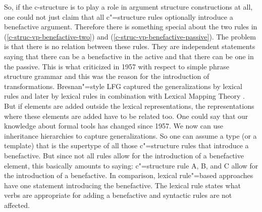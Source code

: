 So, if the c-structure is to play a role in argument structure constructions at all, one could not
just claim that all c"=structure rules optionally introduce a benefactive argument. Therefore there is something special about the two rules in (\ref{c-struc-vp-benefactive-two})
and (\ref{c-struc-vp-benefactive-passive}). The problem is that there is no relation between these
rules. They are independent statements saying that there can be a benefactive in the active and that
there can be one in the passive. This is what \citet[]{Chomsky57a} criticized in 1957 with
respect to simple phrase structure grammar and
this was the reason for the introduction of transformations. Bresnan"=style LFG captured the
generalizations by lexical rules \citep{Bresnan78a,Bresnan82a} and later by lexical rules in combination with Lexical Mapping
Theory \citep{Toivonen2013a}. But if elements are added
outside the lexical representations, the representations where these elements are added 
have to be related too. One could say that our knowledge about formal tools has changed since
1957. We now can use inheritance hierarchies to capture generalizations. So one can assume a type
(or a template) that is the supertype of all those c"=structure rules that introduce a
benefactive. But since not all rules allow for the introduction of a benefactive element, this
basically amounts to saying: c"=structure rule A, B, and C allow for the introduction of a
benefactive. In comparison, lexical rule"=based approaches have one statement introducing the
benefactive. The lexical rule states what verbs are appropriate for adding a benefactive and
syntactic rules are not affected.

